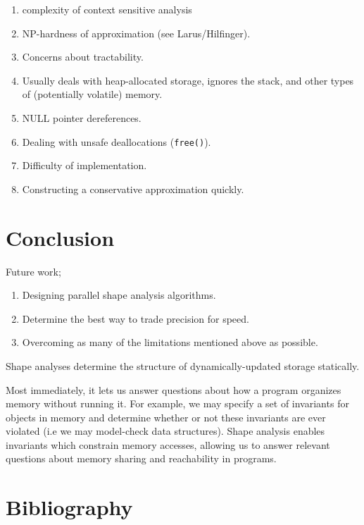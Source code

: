 \documentclass{article}
\begin{document}
\begin{enumerate}[1.]
    \item complexity of context sensitive analysis
    \item NP-hardness of approximation (see Larus/Hilfinger).
    \item Concerns about tractability.
    \item Usually deals with heap-allocated storage, ignores the stack, and
        other types of (potentially volatile) memory.
    \item NULL pointer dereferences.
    \item Dealing with unsafe deallocations (\texttt{free()}).
    \item Difficulty of implementation.
    \item Constructing a conservative approximation quickly.
\end{enumerate}

\section{Conclusion}

Future work;
\begin{enumerate}[1.]
    \item Designing parallel shape analysis algorithms.
    \item Determine the best way to trade precision for speed.
    \item Overcoming as many of the limitations mentioned above as possible.
\end{enumerate}

Shape analyses determine the structure of dynamically-updated storage
statically.

Most immediately, it lets us answer questions about how a program organizes
memory without running it. For example, we may specify a set of invariants
for objects in memory and determine whether or not these invariants are ever
violated (i.e we may model-check data structures). Shape analysis enables
invariants which constrain memory accesses, allowing us to answer relevant
questions about memory sharing and reachability in programs.

\section{Bibliography}
\end{document}
